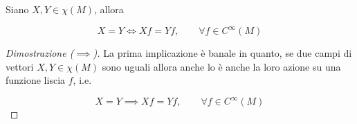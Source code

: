 \begin{theorem}
	Siano $ X,Y \in \chi(M) $, allora
	
	\begin{equation}
		X = Y \iff X f = Y f, \qquad \forall f \in C^{\infty}(M)
	\end{equation}
\end{theorem}

\begin{proof}[Dimostrazione ($ \implies $)]
	La prima implicazione è banale in quanto, se due campi di vettori $ X,Y \in \chi(M) $ sono uguali allora anche lo è anche la loro azione su una funzione liscia $ f $, i.e.
	
	\begin{equation}
		X = Y \implies X f = Y f, \qquad \forall f \in C^{\infty}(M)
	\end{equation}
\end{proof}

